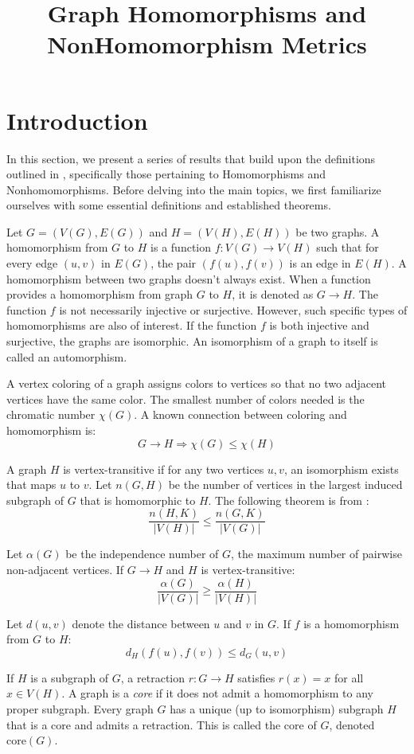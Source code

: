 \documentclass[11pt]{article}
\title{Graph Homomorphisms and NonHomomorphism Metrics}
\author{}
\date{}
\begin{document}
\maketitle

\section{Introduction}
In this section, we present a series of results that build upon the definitions outlined in \cite{kh1}, specifically those pertaining to Homomorphisms and Nonhomomorphisms. Before delving into the main topics, we first familiarize ourselves with some essential definitions and established theorems.

Let $G=(V(G),E(G))$ and $H=(V(H),E(H))$ be two graphs. A homomorphism from $G$ to $H$ is a function $f:V(G) \to V(H)$ such that for every edge $(u,v)$ in $E(G)$, the pair $(f(u),f(v))$ is an edge in $E(H)$. A homomorphism between two graphs doesn't always exist. When a function provides a homomorphism from graph $G$ to $H$, it is denoted as $G\rightarrow H$. The function $f$ is not necessarily injective or surjective. However, such specific types of homomorphisms are also of interest. If the function $f$ is both injective and surjective, the graphs are isomorphic. An isomorphism of a graph to itself is called an automorphism.

A vertex coloring of a graph assigns colors to vertices so that no two adjacent vertices have the same color. The smallest number of colors needed is the chromatic number $\chi(G)$. A known connection between coloring and homomorphism \cite{hn} is:
$$G\rightarrow H \Rightarrow \chi(G) \leq \chi(H)$$

A graph $H$ is vertex-transitive if for any two vertices $u,v$, an isomorphism exists that maps $u$ to $v$. Let $n(G,H)$ be the number of vertices in the largest induced subgraph of $G$ that is homomorphic to $H$. The following theorem is from \cite{hn}:
$$\frac{n(H,K)}{|V(H)|} \leq \frac{n(G,K)}{|V(G)|}$$

Let $\alpha(G)$ be the independence number of $G$, the maximum number of pairwise non-adjacent vertices. If $G\rightarrow H$ and $H$ is vertex-transitive:
$$\frac{\alpha(G)}{|V(G)|} \geq \frac{\alpha(H)}{|V(H)|}$$

Let $d(u,v)$ denote the distance between $u$ and $v$ in $G$. If $f$ is a homomorphism from $G$ to $H$:
$$d_H(f(u), f(v)) \leq d_G(u,v)$$

If $H$ is a subgraph of $G$, a retraction $r : G \rightarrow H$ satisfies $r(x) = x$ for all $x \in V(H)$. A graph is a \textit{core} if it does not admit a homomorphism to any proper subgraph. Every graph $G$ has a unique (up to isomorphism) subgraph $H$ that is a core and admits a retraction. This is called the core of $G$, denoted $\mathrm{core}(G)$.
\end{document}
